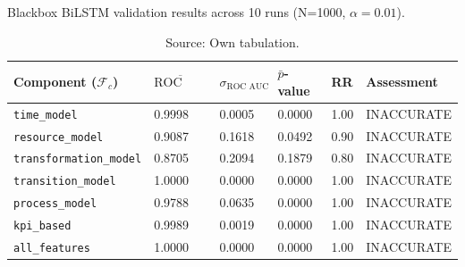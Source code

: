 \begin{table}[htbp]
  \centering
  \caption[Results BiLSTM]{Blackbox BiLSTM validation results across 10 runs (N=1000, $\alpha=0.01$).}
  \label{tab:results-blackbox}
  \begin{tabular}{l l l l l p{3cm}}
    \toprule
    \textbf{Component ($\mathcal{F}_c$)} & \textbf{$\overline{\text{ROC AUC}}$} & \textbf{$\sigma_{\text{ROC AUC}}$} & \textbf{$\bar{p}$-value} & \textbf{RR} & \textbf{Assessment} \\
    \midrule
    \texttt{time\_model}                 & 0.9998                               & 0.0005                             & 0.0000                   & 1.00        & INACCURATE          \\
    \texttt{resource\_model}             & 0.9087                               & 0.1618                             & 0.0492                   & 0.90        & INACCURATE          \\
    \texttt{transformation\_model}       & 0.8705                               & 0.2094                             & 0.1879                   & 0.80        & INACCURATE          \\
    \texttt{transition\_model}           & 1.0000                               & 0.0000                             & 0.0000                   & 1.00        & INACCURATE          \\
    \texttt{process\_model}              & 0.9788                               & 0.0635                             & 0.0000                   & 1.00        & INACCURATE          \\
    \texttt{kpi\_based}                  & 0.9989                               & 0.0019                             & 0.0000                   & 1.00        & INACCURATE          \\
    \texttt{all\_features}               & 1.0000                               & 0.0000                             & 0.0000                   & 1.00        & INACCURATE          \\
    \bottomrule
  \end{tabular}
  \caption*{Source: Own tabulation.}
\end{table}

